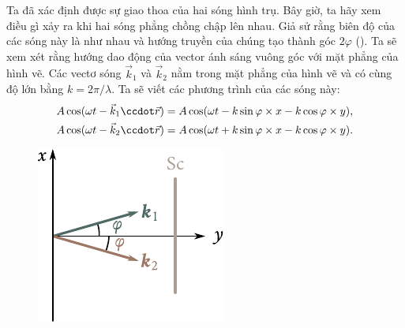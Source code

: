 Ta đã xác định được sự giao thoa của hai sóng hình trụ.
Bây giờ, ta hãy xem điều gì xảy ra khi hai sóng phẳng chồng chập lên nhau.
Giả sử rằng biên độ của các sóng này là như nhau và hướng truyền của chúng tạo thành góc $2\varphi$ ().
Ta sẽ xem xét rằng hướng dao động của vector ánh sáng vuông góc với mặt phẳng của hình vẽ.
Các vectơ sóng $\vec{k}_1$ và $\vec{k}_2$ nằm trong mặt phẳng của hình vẽ và có cùng độ lớn bằng $k=2\pi/\lambda$.
Ta sẽ viết các phương trình của các sóng này:
\begin{align*}
    A \cos(\omega t - \vec{k}_1\ccdot\vec{r}) & = A \cos(\omega t - k \sin\varphi \times x - k \cos\varphi \times y),\\
    A \cos(\omega t - \vec{k}_2\ccdot\vec{r}) & = A \cos(\omega t + k \sin\varphi \times x - k \cos\varphi \times y).
\end{align*}

\begin{figure}[!htb]
	\begin{center}
		\includegraphics[scale=1]{figures/ch_17/fig_17_3.pdf}
		\caption[]{}
		\label{fig:17_3}
	\end{center}
	\vspace{-0.9cm}
\end{figure}

